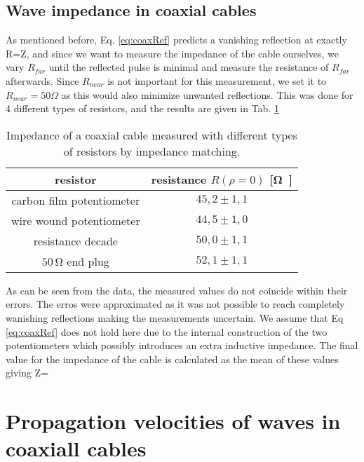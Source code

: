 \documentclass[a4paper,10pt,twocolumn]{article}
\begin{document}
    \subsection{Wave impedance in coaxial cables}
    As mentioned before, Eq. \ref{eq:coaxRef} predicts a vanishing reflection at exactly R=Z, and since we want to measure the impedance of the cable ourselves, we vary $R_{far}$ until the reflected pulse is minimal and measure the resistance of $R_{far}$ afterwards.
    Since $R_{near}$ is not important for this measurement, we set it to $R_{near}=50\Omega $ as this would also minimize unwanted reflections.
    This was done for 4 different types of resistors, and the results are given in Tab. \ref{tab:impedance}
    \begin{table}[htbp]          %
        \centering
        \begin{tabular*}{\linewidth}{@{\extracolsep{\fill}}cc}
            \hline
            \hline
            \rule[-7pt]{0pt}{23pt}  resistor  &  resistance $R(\rho=0)$ [\si\ohm]  	 \\
            \hline
            \rule[-5pt]{0pt}{23pt}   carbon film potentiometer   &   $45,2 \pm 1,1$  	 \\
            \rule[-5pt]{0pt}{23pt}   wire wound potentiometer   &   $44,5 \pm 1,0$  	 \\
            \rule[-5pt]{0pt}{23pt}   resistance decade   &   $50,0 \pm 1,1$  	 \\
            \rule[-5pt]{0pt}{23pt}   $50\,\si\ohm$ end plug   &   $52,1 \pm 1,1$  	 \\
            \hline
            \hline
        \end{tabular*}
        \normalsize
        \caption[]{Impedance of a coaxial cable measured with different types of resistors by impedance matching.}  %
        \label{tab:impedance}                             %
    \end{table}
    As can be seen from the data, the measured values do not coincide within their errors. The erros were approximated as it was not possible to reach completely wanishing reflections making the measurements uncertain.
    We assume that Eq \ref{eq:coaxRef} does not hold here due to the internal construction of the two potentiometers which possibly introduces an extra inductive impedance.
    The final value for the impedance of the cable is calculated as the mean of these values giving Z=
    \section{Propagation velocities of waves in coaxiall cables}
\end{document}
